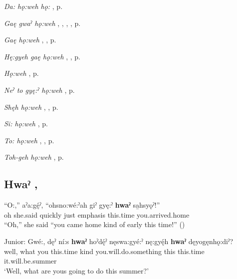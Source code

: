\begin{CayugaRelated}
\item \textit{Da: hǫ:weh hǫ:} , p. \pageref{p:[da: hǫ:weh hǫ:]}\\
\item \textit{Gaę gwaˀ hǫ:weh} , , , , p. \pageref{p:[gaę gwaˀ hǫ:weh]}\\
\item \textit{Gaę hǫ:weh} , , p. \pageref{p:[gaę hǫ:weh]}\\
\item \textit{Hę:gyeh gaę hǫ:weh} , , p. \pageref{p:[hę:-gyeh gaę hǫ:weh]}\\
\item \textit{Hǫ:weh} , p. \pageref{p:[hǫ:weh]}\\
\item \textit{Neˀ to gyę:ˀ hǫ:weh} , p. \pageref{p:[neˀ to gyę:ˀ hǫ:weh]}\\
\item \textit{Shęh hǫ:weh} , , p. \pageref{p:[shęh hǫ:weh]}\\
\item \textit{Si: hǫ:weh} , p. \pageref{p:[si: hǫ:weh]}\\
\item \textit{To: hǫ:weh} , , p. \pageref{p:[to: hǫ:weh]}\\
\item \textit{Toh-geh hǫ:weh} , p. \pageref{p:[toh-geh hǫ:weh]}
\end{CayugaRelated}


\subsection*{\textbf{Hwaˀ} , } \label{p:[hwaˀ]}

\ea
\label{ex:hpar58}
\gll “O:,” aˀa:gę́ˀ, “ohsno:wé:ˀah giˀ gyę:ˀ \textbf{hwaˀ} sa̱hsyǫˀ!”\\
oh she.said quickly just emphasis this.time you.arrived.home\\
\glt “Oh,” she said “you came home kind of early this time!” (\cite{henry_de_2005})
\z

\ea
\label{ex:hpar59}
\gll Junior: Gwé:, dęˀ ní:s \textbf{hwaˀ} hoˀdę́ˀ nęswa:gyé:ˀ nę:gyę́h \textbf{hwaˀ} dęyogęnhǫ:diˀ?\\
{} well, what you this.time kind you.will.do.something this this.time it.will.be.summer\\
\glt ‘Well, what are yous going to do this summer?’

